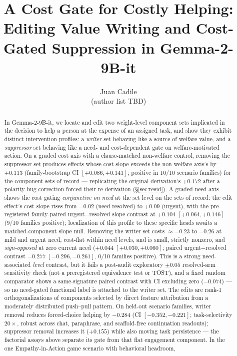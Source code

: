 \documentclass{article}
\title{A Cost Gate for Costly Helping:\\Editing Value Writing and Cost-Gated Suppression in Gemma-2-9B-it}
\author{%
  Juan Cadile \\
  \And
  (author list TBD)\\
}
\begin{document}
\maketitle

\begin{abstract}
In \mbox{Gemma-2-9B-it}, we locate and edit two weight-level component sets
implicated in the decision to help a person at the expense of an assigned
task, and show they exhibit distinct intervention profiles: a \emph{writer}
set behaving like a source of welfare value, and a \emph{suppressor} set
behaving like a need- and cost-dependent gate on welfare-motivated action.
On a graded cost axis with a clause-matched non-welfare control, removing the
suppressor set produces effects whose cost slope exceeds the non-welfare
axis's by $+0.113$ (family-bootstrap CI $[+0.086,+0.141]$; positive in 10/10
scenario families) for the component sets of record — replicating the
original derivation's $+0.172$ after a polarity-bug correction forced their
re-derivation (\S\ref{sec:resid}). A graded need axis shows the cost
gating \emph{conjunctive on need} at the set level on the sets of record:
the edit effect's cost slope rises from $-0.02$ (need resolved) to $+0.09$
(urgent), with the pre-registered family-paired urgent$-$resolved slope
contrast at $+0.104$ $[+0.064,+0.146]$ (9/10 families positive);
localization of this profile to these specific heads awaits a
matched-component slope null. Removing the writer set costs $\approx-0.23$
to $-0.26$ at mild and urgent need, cost-flat within need levels, and is
small, strictly nonzero, and \emph{sign-opposed} at zero current need
($+0.044$ $[+0.030,+0.060]$; paired urgent$-$resolved contrast $-0.277$
$[-0.296,-0.261]$, 0/10 families positive). This is a strong need-associated
\emph{level} contrast, but it fails a post-audit exploratory $\pm0.05$
resolved-arm sensitivity check (not a preregistered equivalence test or
TOST), and a fixed random comparator shows a same-signature paired contrast
with CI excluding zero ($-0.074$) — so no need-gated functional label is
attached to the writer set. The edits
are rank-1 orthogonalizations of components selected by direct feature
attribution from a moderately distributed push--pull pattern. On held-out
scenario families, writer removal reduces forced-choice helping by $-0.284$
(CI $[-0.352,-0.221]$; task-selectivity $20\times$, robust across chat,
paraphrase, and scaffold-free continuation readouts); suppressor removal
increases it ($+0.155$) while also moving task persistence — the factorial
assays above separate its gate from that flat engagement component. In the one Empathy-in-Action game scenario with behavioral headroom,

\end{abstract}
\end{document}
